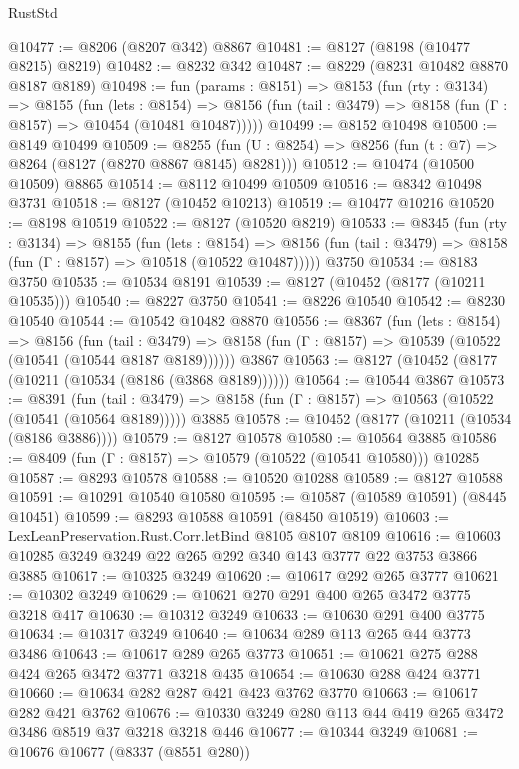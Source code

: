 \begin{lexlean}{RustStd}
\begin{coremodule}
@10477 := @8206 (@8207 @342) @8867
@10481 := @8127 (@8198 (@10477 @8215) @8219)
@10482 := @8232 @342
@10487 := @8229 (@8231 @10482 @8870 @8187 @8189)
@10498 := fun (params : @8151) =>
  @8153
    (fun (rty : @3134) =>
    @8155
      (fun (lets : @8154) =>
      @8156 (fun (tail : @3479) => @8158 (fun (Γ : @8157) => @10454 (@10481 @10487)))))
@10499 := @8152 @10498
@10500 := @8149 @10499
@10509 := @8255 (fun (U : @8254) => @8256 (fun (t : @7) => @8264 (@8127 (@8270 @8867 @8145) @8281)))
@10512 := @10474 (@10500 @10509) @8865
@10514 := @8112 @10499 @10509
@10516 := @8342 @10498 @3731
@10518 := @8127 (@10452 @10213)
@10519 := @10477 @10216
@10520 := @8198 @10519
@10522 := @8127 (@10520 @8219)
@10533 := @8345
    (fun (rty : @3134) =>
    @8155
      (fun (lets : @8154) =>
      @8156 (fun (tail : @3479) => @8158 (fun (Γ : @8157) => @10518 (@10522 @10487)))))
    @3750
@10534 := @8183 @3750
@10535 := @10534 @8191
@10539 := @8127 (@10452 (@8177 (@10211 @10535)))
@10540 := @8227 @3750
@10541 := @8226 @10540
@10542 := @8230 @10540
@10544 := @10542 @10482 @8870
@10556 := @8367
    (fun (lets : @8154) =>
    @8156
      (fun (tail : @3479) =>
      @8158 (fun (Γ : @8157) => @10539 (@10522 (@10541 (@10544 @8187 @8189))))))
    @3867
@10563 := @8127 (@10452 (@8177 (@10211 (@10534 (@8186 (@3868 @8189))))))
@10564 := @10544 @3867
@10573 := @8391
    (fun (tail : @3479) => @8158 (fun (Γ : @8157) => @10563 (@10522 (@10541 (@10564 @8189)))))
    @3885
@10578 := @10452 (@8177 (@10211 (@10534 (@8186 @3886))))
@10579 := @8127 @10578
@10580 := @10564 @3885
@10586 := @8409 (fun (Γ : @8157) => @10579 (@10522 (@10541 @10580))) @10285
@10587 := @8293 @10578
@10588 := @10520 @10288
@10589 := @8127 @10588
@10591 := @10291 @10540 @10580
@10595 := @10587 (@10589 @10591) (@8445 @10451)
@10599 := @8293 @10588 @10591 (@8450 @10519)
@10603 := LexLeanPreservation.Rust.Corr.letBind @8105 @8107 @8109
@10616 := @10603 @10285 @3249 @3249 @22 @265 @292 @340 @143 @3777 @22 @3753 @3866 @3885
@10617 := @10325 @3249
@10620 := @10617 @292 @265 @3777
@10621 := @10302 @3249
@10629 := @10621 @270 @291 @400 @265 @3472 @3775 @3218 @417
@10630 := @10312 @3249
@10633 := @10630 @291 @400 @3775
@10634 := @10317 @3249
@10640 := @10634 @289 @113 @265 @44 @3773 @3486
@10643 := @10617 @289 @265 @3773
@10651 := @10621 @275 @288 @424 @265 @3472 @3771 @3218 @435
@10654 := @10630 @288 @424 @3771
@10660 := @10634 @282 @287 @421 @423 @3762 @3770
@10663 := @10617 @282 @421 @3762
@10676 := @10330 @3249 @280 @113 @44 @419 @265 @3472 @3486 @8519 @37 @3218 @3218 @446
@10677 := @10344 @3249
@10681 := @10676 @10677 (@8337 (@8551 @280))

\end{coremodule}
\end{lexlean}
